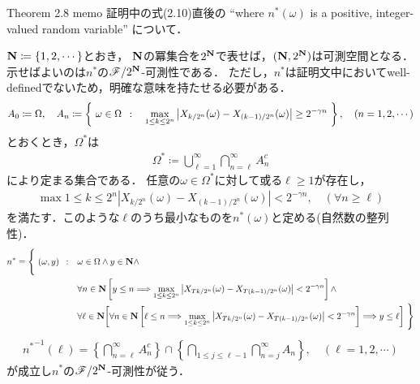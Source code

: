 	\begin{itembox}[l]{Theorem 2.8 memo}
		証明中の式(2.10)直後の
		``where $n^*(\omega)$ is a positive, integer-valued random variable''
		について．
	\end{itembox}
	
	\begin{prf}
		$\mathbf{N} \coloneqq \{1,2,\cdots\}$とおき，
		$\mathbf{N}$の冪集合を$2^{\mathbf{N}}$で表せば，$(\mathbf{N},2^{\mathbf{N}})$は可測空間となる．
		示せばよいのは$n^*$の$\mathscr{F}/2^{\mathbf{N}}$-可測性である．
		ただし，$n^*$は証明文中においてwell-definedでないため，明確な意味を持たせる必要がある．
		\begin{align}
			A_0 \coloneqq \Omega,
			\quad A_n \coloneqq \left\{\ \omega \in \Omega\ \, : \quad \operatorname*{max}_{1 \leq k \leq 2^n} \left| X_{k/2^n}(\omega) - X_{(k-1)/2^n}(\omega) \right| \geq 2^{-\gamma n}\ \right\},
			\quad (n=1,2,\cdots)
		\end{align}
		とおくとき，$\Omega^*$は
		\begin{align}
			\Omega^* \coloneqq \bigcup_{\ell =1}^{\infty} \bigcap_{n = \ell}^\infty A_n^c
		\end{align}
		により定まる集合である．
		任意の$\omega \in \Omega^*$に対して或る$\ell \geq 1$が存在し，
		\begin{align}
			\max{1 \leq k \leq 2^n}{\left| X_{k/2^n}(\omega) - X_{(k-1)/2^n}(\omega) \right|} < 2^{-\gamma n},
			\quad (\forall n \geq \ell)
		\end{align}
		を満たす．このような$\ell$のうち最小なものを$n^*(\omega)$と定める(自然数の整列性)．
		\begin{align}
			n^* = \Biggl\{\ (\omega,y)\ \, : \quad &\omega \in \Omega \wedge y \in \mathbf{N} \wedge \Biggr.\\
			&\forall n \in \mathbf{N}\left[y \leq n \Longrightarrow \operatorname*{max}_{1 \leq k \leq 2^n}\left|X_{Tk/2^n}(\omega) - X_{T(k-1)/2^n}(\omega)\right| < 2^{-\gamma n}\right] \wedge \\
			&\forall \ell \in \mathbf{N}
			\Biggl. \left[\forall n \in \mathbf{N}\left[\ell \leq n \Longrightarrow \operatorname*{max}_{1 \leq k \leq 2^n}\left|X_{Tk/2^n}(\omega) - X_{T(k-1)/2^n}(\omega)\right| < 2^{-\gamma n}\right] \Longrightarrow y \leq \ell\right]\ \Biggr\}
		\end{align}
		\begin{align}
			{n^*}^{-1}(\ell) = \left\{ \bigcap_{n = \ell}^\infty A_n^c \right\} \cap \left\{ \bigcap_{1 \leq j \leq \ell-1} \bigcap_{n = j}^\infty A_n \right\},
			\quad (\ell =1,2,\cdots)
		\end{align}
		が成立し$n^*$の$\mathscr{F}/2^{\mathbf{N}}$-可測性が従う．
		\QED
	\end{prf}
	
